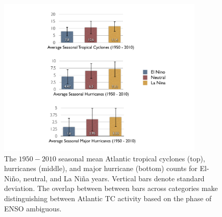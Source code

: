 \documentclass[]{article}
\begin{document}

\begin{figure}[htbp]
	\centering
		\includegraphics[height=3in]{figures/nino_nina_avg_diff.pdf}
	\caption{The $1950-2010$ seasonal mean Atlantic tropical cyclones (top), hurricanes (middle), and major hurricane (bottom) counts for El-Ni\~no, neutral, and La Ni\~na years. Vertical bars denote standard deviation. The overlap between between bars across categories make distinguishing between Atlantic TC activity based on the phase of ENSO ambiguous.}
	\label{fig:enso_bars}
\end{figure}
\end{document}
